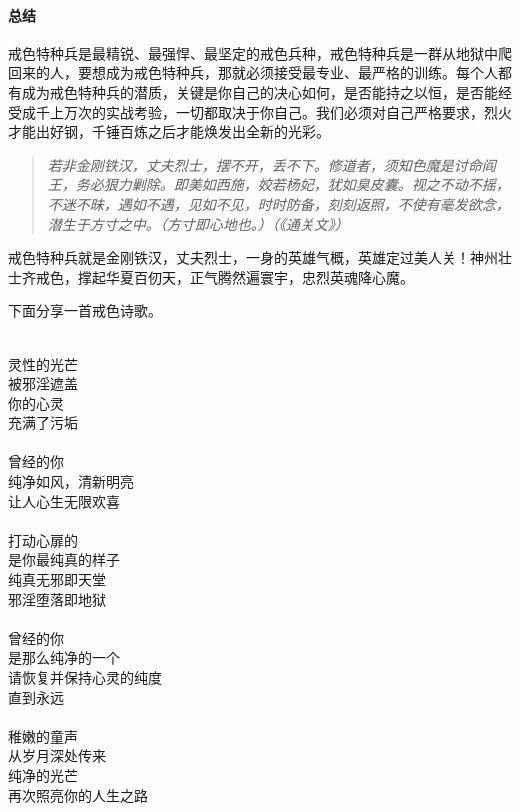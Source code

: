 \paragraph*{总结}

戒色特种兵是最精锐、最强悍、最坚定的戒色兵种，戒色特种兵是一群从地狱中爬回来的人，要想成为戒色特种兵，那就必须接受最专业、最严格的训练。每个人都有成为戒色特种兵的潜质，关键是你自己的决心如何，是否能持之以恒，是否能经受成千上万次的实战考验，一切都取决于你自己。我们必须对自己严格要求，烈火才能出好钢，千锤百炼之后才能焕发出全新的光彩。

\begin{quote}\it
    若非金刚铁汉，丈夫烈士，摆不开，丢不下。修道者，须知色魔是讨命阎王，务必狠力剿除。即美如西施，姣若杨妃，犹如臭皮囊。视之不动不摇，不迷不昧，遇如不遇，见如不见，时时防备，刻刻返照，不使有毫发欲念，潜生于方寸之中。（方寸即心地也。）（《通关文》）
\end{quote}

戒色特种兵就是金刚铁汉，丈夫烈士，一身的英雄气概，英雄定过美人关！神州壮士齐戒色，撑起华夏百仞天，正气腾然遍寰宇，忠烈英魂降心魔。

下面分享一首戒色诗歌。

\begin{poem}[消逝的光芒]
    \begin{multicols}{3}
        \centering~\\
        灵性的光芒 \\ 被邪淫遮盖 \\ 你的心灵 \\ 充满了污垢\\~\\
        曾经的你 \\ 纯净如风，清新明亮 \\ 让人心生无限欢喜\\~\\
        打动心扉的 \\ 是你最纯真的样子 \\ 纯真无邪即天堂 \\ 邪淫堕落即地狱\\~\\
        曾经的你 \\ 是那么纯净的一个 \\ 请恢复并保持心灵的纯度 \\ 直到永远\\~\\
        稚嫩的童声 \\ 从岁月深处传来 \\ 纯净的光芒 \\ 再次照亮你的人生之路
    \end{multicols}
\end{poem}

